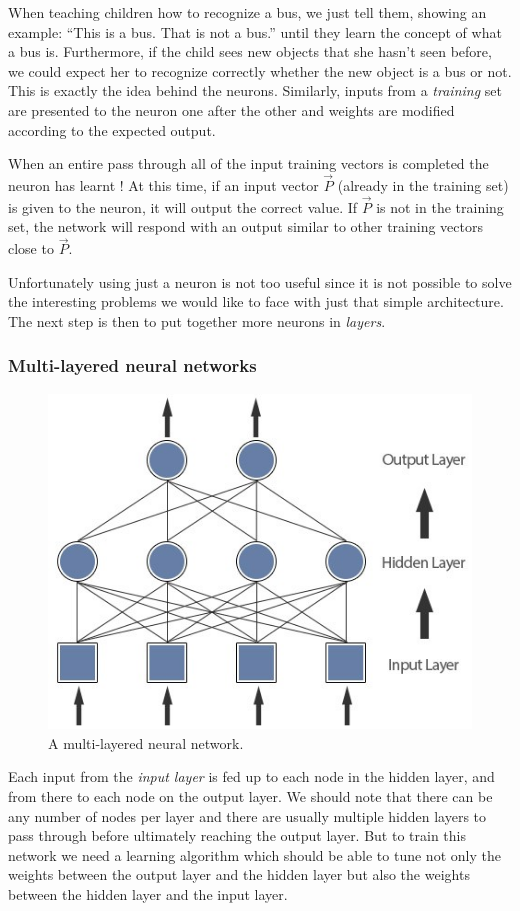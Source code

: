 \documentclass[11pt]{article}
\begin{document}
When teaching children how to recognize a bus, we just tell them,
showing an example: ``This is a bus. That is not a bus.'' until they
learn the concept of what a bus is. Furthermore, if the child sees new
objects that she hasn't seen before, we could expect her to recognize
correctly whether the new object is a bus or not. This is exactly the
idea behind the neurons. Similarly, inputs from a \emph{training} set
are presented to the neuron one after the other and weights are modified
according to the expected output.

When an entire pass through all of the input training vectors is
completed the neuron has learnt ! At this time, if an input vector
$\vec{P}$ (already in the training set) is given to the neuron, it
will output the correct value. If $\vec{P}$ is not in the training
set, the network will respond with an output similar to other training
vectors close to $\vec{P}$.

Unfortunately using just a neuron is not too useful since it is not
possible to solve the interesting problems we would like to face with
just that simple architecture. The next step is then to put together
more neurons in \emph{layers}.

\hypertarget{multi-layered-neural-networks}{%
\subsubsection{Multi-layered neural
networks}\label{multi-layered-neural-networks}}

\begin{figure}
\centering
\includegraphics[width=0.7\linewidth]{multilayer.jpeg}
\caption{A multi-layered neural network.}
\end{figure}

Each input from the \emph{input layer} is fed up to each node in the
hidden layer, and from there to each node on the output layer. We should
note that there can be any number of nodes per layer and there are
usually multiple hidden layers to pass through before ultimately
reaching the output layer. But to train this network we need a learning
algorithm which should be able to tune not only the weights between the
output layer and the hidden layer but also the weights between the
hidden layer and the input layer.
\end{document}

